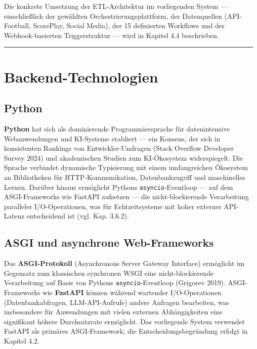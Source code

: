 Die konkrete Umsetzung der ETL-Architektur im vorliegenden System ---
einschließlich der gewählten Orchestrierungsplattform, der Datenquellen
(API-Football, ScorePlay, Social Media), der 15 definierten Workflows
und der Webhook-basierten Triggerstruktur --- wird in Kapitel 4.4
beschrieben.

\begin{center}\rule{0.5\linewidth}{0.5pt}\end{center}

\section{Backend-Technologien}\label{backend-technologien}

\subsection{Python}\label{python}

\textbf{Python} hat sich als dominierende Programmiersprache für
datenintensive Webanwendungen und KI-Systeme etabliert --- ein Konsens,
der sich in konsistenten Rankings von Entwickler-Umfragen (Stack
Overflow Developer Survey 2024) und akademischen Studien zum
KI-Ökosystem widerspiegelt. Die Sprache verbindet dynamische Typisierung
mit einem umfangreichen Ökosystem an Bibliotheken für
HTTP-Kommunikation, Datenbankzugriff und maschinelles Lernen. Darüber
hinaus ermöglicht Pythons \texttt{asyncio}-Eventloop --- auf dem
ASGI-Frameworks wie FastAPI aufsetzen --- die nicht-blockierende
Verarbeitung paralleler I/O-Operationen, was für Echtzeitsysteme mit
hoher externer API-Latenz entscheidend ist (vgl. Kap. 3.6.2).

\subsection{ASGI und asynchrone
Web-Frameworks}\label{asgi-und-asynchrone-web-frameworks}

Das \textbf{ASGI-Protokoll} (Asynchronous Server Gateway Interface)
ermöglicht im Gegensatz zum klassischen synchronen WSGI eine
nicht-blockierende Verarbeitung auf Basis von Pythons
\texttt{asyncio}-Eventloop (Grigorev 2019). ASGI-Frameworks wie
\textbf{FastAPI} können während wartender I/O-Operationen
(Datenbankabfragen, LLM-API-Aufrufe) andere Anfragen bearbeiten, was
insbesondere für Anwendungen mit vielen externen Abhängigkeiten eine
signifikant höhere Durchsatzrate ermöglicht. Das vorliegende System
verwendet FastAPI als primäres ASGI-Framework; die
Entscheidungsbegründung erfolgt in Kapitel 4.2.

